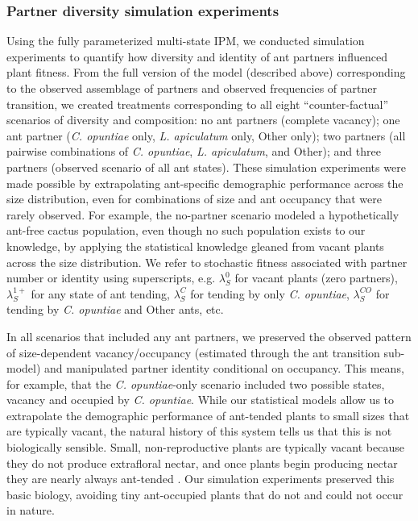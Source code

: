 \documentclass[11pt]{article}
\begin{document}
\subsubsection*{Partner diversity simulation experiments}
Using the fully parameterized multi-state IPM, we conducted simulation experiments to quantify how diversity and identity of ant partners influenced plant fitness. 
From the full version of the model (described above) corresponding to the observed assemblage of partners and observed frequencies of partner transition, we created treatments corresponding to all eight ``counter-factual'' scenarios of diversity and composition: no ant partners (complete vacancy); one ant partner (\textit{C. opuntiae} only, \textit{L. apiculatum} only, Other only); two partners (all pairwise combinations of \textit{C. opuntiae}, \textit{L. apiculatum}, and Other); and three partners (observed scenario of all ant states).
These simulation experiments were made possible by extrapolating ant-specific demographic performance across the size distribution, even for combinations of size and ant occupancy that were rarely observed. 
For example, the no-partner scenario modeled a hypothetically ant-free cactus population, even though no such population exists to our knowledge, by applying the statistical knowledge gleaned from vacant plants across the size distribution. 
We refer to stochastic fitness associated with partner number or identity using superscripts, e.g. $\lambda^{0}_{S}$ for vacant plants (zero partners), $\lambda^{1+}_{S}$ for any state of ant tending, $\lambda^{C}_{S}$ for tending by only \textit{C. opuntiae}, $\lambda^{CO}_{S}$ for tending by \textit{C. opuntiae} and Other ants, etc.

In all scenarios that included any ant partners, we preserved the observed pattern of size-dependent vacancy/occupancy (estimated through the ant transition sub-model) and manipulated partner identity conditional on occupancy. 
This means, for example, that the \textit{C. opuntiae}-only scenario included two possible states, vacancy and occupied by \textit{C. opuntiae}. 
While our statistical models allow us to extrapolate the demographic performance of ant-tended plants to small sizes that are typically vacant, the natural history of this system tells us that this is not biologically sensible. 
Small, non-reproductive plants are typically vacant because they do not produce extrafloral nectar, and once plants begin producing nectar they are nearly always ant-tended \citep{Miller2014}. 
Our simulation experiments preserved this basic biology, avoiding tiny ant-occupied plants that do not and could not occur in nature. 
\end{document}
